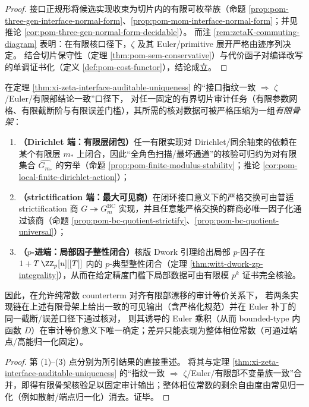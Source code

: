 \begin{proof}
接口正规形将候选实现收束为切片内的有限可枚举族（命题 \ref{prop:pom-three-gen-interface-normal-form}、\ref{prop:pom-mom-interface-normal-form}；并见推论 \ref{cor:pom-three-gen-normal-form-decidable}）。
而注 \ref{rem:zetaK-commuting-diagram} 表明：在有限核口径下，\(\zeta\) 及其 Euler/primitive 展开严格由迹序列决定。
结合切片保守性（定理 \ref{thm:pom-sem-conservative}）与代价函子对编译改写的单调证书化（定义 \ref{def:pom-cost-functor}），结论成立。
\end{proof}

\begin{corollary}\label{cor:xi-finite-skeleton-euler-uniqueness}
在定理 \ref{thm:xi-zeta-interface-auditable-uniqueness} 的“接口指纹一致 \(\Rightarrow\) \(\zeta\)/Euler/有限部结论一致”口径下，
对任一固定的有界切片审计任务（有限参数网格、有限截断阶与有限误差门槛），其所需的核对数据可被严格压缩为一组\emph{有限骨架}：
\begin{enumerate}
  \item \textbf{（Dirichlet 端：有限层闭包）}任一有限实现对 Dirichlet/同余轴束的依赖在某个有限层 \(m_\ast\) 上闭合，因此“全角色扫描/最坏通道”的核验可归约为对有限集合 \(\widehat{G_{m_\ast}}\) 的穷举（命题 \ref{prop:pom-finite-modulus-stability}；推论 \ref{cor:pom-local-finite-dirichlet-action}）；
  \item \textbf{（strictification 端：最大可见商）}在闭环接口意义下的严格交换可由普适 strictification 商 \(G\twoheadrightarrow G^{\mathrm{BC}}_{m}\) 实现，并且任意能严格交换的群商必唯一因子化通过该商（命题 \ref{prop:pom-bc-quotient-strictify}、\ref{prop:pom-bc-quotient-universal}）；
  \item \textbf{（\(p\)-进端：局部因子整性闭合）}核版 Dwork 引理给出局部 \(p\)-因子在 \(1+T\,\ZZ_p[u][[T]]\) 内的 \(p\)-典型整性闭合（定理 \ref{thm:witt-dwork-zp-integrality}），从而在给定精度门槛下局部数据可由有限模 \(p^k\) 证书完全核验。
\end{enumerate}
因此，在允许纯常数 counterterm 对齐有限部漂移的审计等价关系下，
若两条实现链在上述有限骨架上给出一致的可见输出（含严格化规范）并在 Euler 补丁的同一截断/误差口径下通过核对，
则其诱导的 Euler 乘积（从而 bounded-type 内函数 \(D\)）在审计等价意义下唯一确定；差异只能表现为整体相位常数（可通过端点/高能归一化固定）。
\end{corollary}
\begin{proof}
第 (1)–(3) 点分别为所引结果的直接重述。
将其与定理 \ref{thm:xi-zeta-interface-auditable-uniqueness} 的“指纹一致 \(\Rightarrow\) \(\zeta\)/Euler/有限部不变量族一致”合并，即得有限骨架核验足以固定审计输出；整体相位常数的剩余自由度由常见归一化（例如散射/端点归一化）消去。证毕。
\end{proof}

